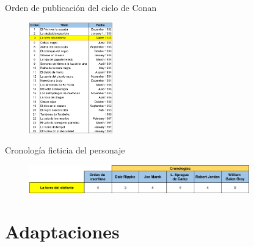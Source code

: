 \begin{frame}{Orden de publicación del ciclo de Conan}
\begin{figure}[htb]
  \centering
  \includegraphics[width=0.32\textwidth]{img/OrdenPublicacion}
\end{figure}
\end{frame}

\begin{frame}{Cronología ficticia del personaje}
\begin{figure}[htb]
  \centering
  \includegraphics[width=0.85\textwidth]{img/Cronollogias}
\end{figure}
\end{frame}

\section{Adaptaciones}

